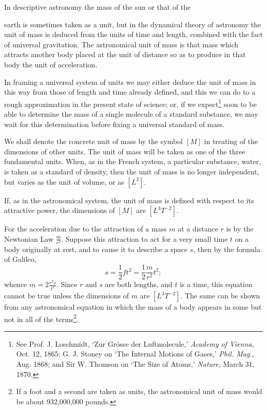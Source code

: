 \documentclass[11pt,a4paper]{article}
\begin{document}
In descriptive astronomy the mass of the sun or that of the

\clearpage

\setcounter{footnote}{0}
earth is sometimes taken as a unit, but in the dynamical theory of
astronomy the unit of mass is deduced from the units of time and length,
combined with the fact of universal gravitation. The astronomical unit of
mass is that mass which attracts another body placed at the unit of
distance so as to produce in that body the unit of acceleration.

In framing a universal system of units we may either deduce the unit of
mass in this way from those of length and time already defined, and this
we can do to a rough approximation in the present state of science; or,
if we expect\footnote{See Prof. J. Loschmidt, `Zur Grösse der
Luftmolecule,' \textit{Academy of Vienna}, Oct. 12, 1865; G. J. Stoney
on `The Internal Motions of Gases,' \textit{Phil. Mag.}, Aug. 1868; and
Sir W. Thomson on `The Size of Atoms,' \textit{Nature}, March 31, 1870.}
soon to be able to determine the mass of a single molecule of a standard
substance, we may wait for this determination before fixing a universal
standard of mass.

We shall denote the concrete unit of mass by the symbol \([M]\) in
treating of the dimensions of other units. The unit of mass will be taken
as one of the three fundamental units. When, as in the French system, a
particular substance, water, is taken as a standard of density, then the
unit of mass is no longer independent, but varies as the unit of volume,
or as \([L^3]\).

If, as in the astronomical system, the unit of mass is defined with
respect to its attractive power, the dimensions of \([M]\) are
\([L^3T^{-2}]\).

For the acceleration due to the attraction of a mass \(m\) at a distance
\(r\) is by the Newtonian Law \(\frac{m}{r^2}\). Suppose this attraction
to act for a very small time \(t\) on a body originally at rest, and to
cause it to describe a space \(s\), then by the formula of Galileo,
\[
s = \frac{1}{2} f t^2 = \frac{1}{2}\frac{m}{r^2}t^2;
\]
whence \(m = 2\frac{r^2s}{t^2}\). Since \(r\) and \(s\) are both
lengths, and \(t\) is a time, this equation cannot be true unless the
dimensions of \(m\) are \([L^3T^{-2}]\). The same can be shown from any
astronomical equation in which the mass of a body appears in some but not
in all of the terms\footnote{If a foot and a second are taken as units,
the astronomical unit of mass would be about 932,000,000 pounds.}.
\end{document}
